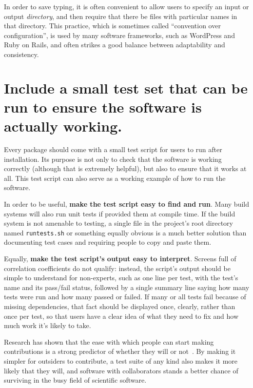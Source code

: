 \documentclass[10pt,letterpaper]{article}
\begin{document}
In order to save typing, it is often convenient to allow users to
specify an input or output \emph{directory}, and then require that there
be files with particular names in that directory. This practice, which
is sometimes called ``convention over configuration'', is used by many
software frameworks, such as WordPress and Ruby on Rails, and often
strikes a good balance between adaptability and consistency.

\section{Include a small test set that can be run to ensure the software is actually working.}

Every package should come with a small test script for users to run
after installation. Its purpose is not only to check that the software
is working correctly (although that is extremely helpful), but also to
ensure that it works at all. This test script can also serve as a
working example of how to run the software.

In order to be useful, \textbf{make the test script easy to find and run}. 
Many build systems will also run unit tests if provided them at compile time.
If the build system is not amenable to testing, a 
single file in the project's root directory named \texttt{runtests.sh}
or something equally obvious is a much better solution than documenting
test cases and requiring people to copy and paste them.

Equally, \textbf{make the test script's output easy to interpret}. Screens
full of correlation coefficients do not qualify: instead, the script's
output should be simple to understand for non-experts,
such as one line per test, with the test's name
and its pass/fail status, followed by a single summary line saying how
many tests were run and how many passed or failed. If many or all tests
fail because of missing dependencies, that fact should be displayed
once, clearly, rather than once per test, so that users have a clear
idea of what they need to fix and how much work it's likely to take.

Research has shown that the ease with which people can start making
contributions is a strong predictor of whether they will or not~\cite{steinmacher2015}.
By making it simpler for outsiders to contribute,
a test suite of any kind also makes it more likely that they will, and software
with collaborators stands a better chance of surviving in the busy field of
scientific software.
\end{document}
